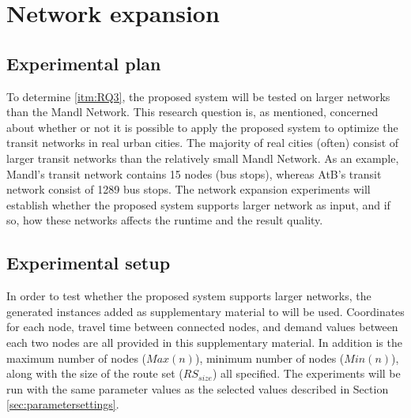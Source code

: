 \section{Network expansion}

\subsection{Experimental plan}
To determine \vref{itm:RQ3}, the proposed system will be tested on larger networks than the Mandl Network. This research question is, as mentioned, concerned about whether or not it is possible to apply the proposed system to optimize the transit networks in real urban cities. The majority of real cities (often) consist of larger transit networks than the relatively small Mandl Network. As an example, Mandl's transit network contains 15 nodes (bus stops), whereas AtB's \citep{website:atb} transit network consist of 1289 bus stops. The network expansion experiments will establish whether the proposed system supports larger network as input, and if so, how these networks affects the runtime and the result quality.



\subsection{Experimental setup}
\label{subsec:scalabilityExperiments_setup}

In order to test whether the proposed system supports larger networks, the generated instances added as supplementary material to \citet{mumford13} will be used. Coordinates for each node, travel time between connected nodes, and demand values between each two nodes are all provided in this supplementary material. In addition is the maximum number of nodes ($Max(n)$), minimum number of nodes ($Min(n)$), along with the size of the route set ($RS_{size}$) all specified. The experiments will be run with the same parameter values as the selected values described in Section \vref{sec:parametersettings}.

